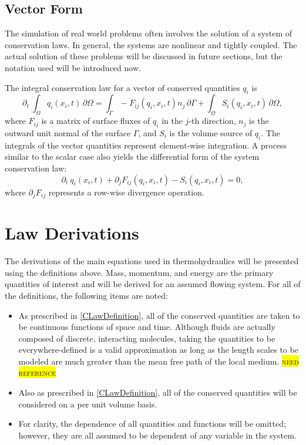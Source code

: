 \documentclass[Prelim,12pt]{WisconsinThesis}
\newcommand{\NeedReference}{\colorbox{yellow}{\textsc{need reference}}}
\newcommand{\pdt}   {\partial_t\:\!}
\newcommand{\pdj}   {\partial_j}
\newcommand{\V}     {\ensuremath{\Omega}}
\newcommand{\dV}    {\,\partial\V}
\newcommand{\IntV}  {\int_{\V}}
\renewcommand{\S}   {\ensuremath{\Gamma}}
\newcommand{\dS}    {\,\partial\S}
\newcommand{\IntS}  {\int_{\S}}
\newcommand{\qi}    {\ensuremath{q_i}}
\begin{document}
\subsection{Vector Form}
The simulation of real world problems often involves the solution of a system of conservation laws.
In general, the systems are nonlinear and tightly coupled.
The actual solution of these problems will be discussed in future sections, but the notation used will be introduced now.

The integral conservation law for a vector of conserved quantities \qi{} is
\begin{equation}%
    \pdt\!\IntV \qi(x_i,t) \dV = \IntS -F_{ij}(\qi,x_i,t) n_j\dS + \IntV S_i(\qi,x_i,t) \dV,
    \label{Eqn:GeneralIntegralCLawForSystems}
\end{equation}
where $F_{ij}$ is a matrix of surface fluxes of \qi{} in the $j$-th direction, $n_j$ is the outward unit normal of the surface \S{}, and $S_i$ is the volume source of \qi{}.
The integrals of the vector quantities represent element-wise integration.
A process similar to the scalar case also yields the differential form of the system conservation law:
\begin{equation}
    \pdt\qi(x_i,t) + \pdj F_{ij}(\qi,x_i,t) - S_i(\qi,x_i,t)  = 0,
    \label{Eqn:PreLimitGeneralIntegralCLawForSystems}
\end{equation}
where $\pdj F_{ij}$ represents a row-wise divergence operation.






\section{Law Derivations}

The derivations of the main equations used in thermohydraulics will be presented using the definitions above.
Mass, momentum, and energy are the primary quantities of interest and will be derived for an assumed flowing system.
For all of the definitions, the following items are noted:
\begin{itemize}
    \item{
        As prescribed in \cref{CLawDefinition}, all of the conserved quantities are taken to be continuous functions of space and time.
        Although fluids are actually composed of discrete, interacting molecules, taking the quantities to be everywhere-defined is a valid approximation as long as the length scales to be modeled are much greater than the mean free path of the local medium.
        \NeedReference{}
    }
    \item{
        Also as prescribed in \cref{CLawDefinition}, all of the conserved quantities will be considered on a per unit volume basis.
    }
    \item{
        For clarity, the dependence of all quantities and functions will be omitted; however, they are all assumed to be dependent of any variable in the system.
    }
\end{itemize}
\end{document}
